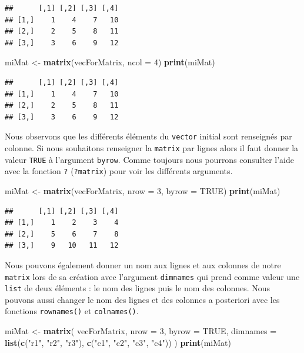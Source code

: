 \documentclass[
]{book}
\newenvironment{Shaded}{\begin{snugshade}}{\end{snugshade}}
\newcommand{\DataTypeTok}[1]{\textcolor[rgb]{0.13,0.29,0.53}{#1}}
\newcommand{\DecValTok}[1]{\textcolor[rgb]{0.00,0.00,0.81}{#1}}
\newcommand{\KeywordTok}[1]{\textcolor[rgb]{0.13,0.29,0.53}{\textbf{#1}}}
\newcommand{\NormalTok}[1]{#1}
\newcommand{\OtherTok}[1]{\textcolor[rgb]{0.56,0.35,0.01}{#1}}
\newcommand{\StringTok}[1]{\textcolor[rgb]{0.31,0.60,0.02}{#1}}
\begin{document}
\begin{verbatim}
##      [,1] [,2] [,3] [,4]
## [1,]    1    4    7   10
## [2,]    2    5    8   11
## [3,]    3    6    9   12
\end{verbatim}

\begin{Shaded}
\begin{Highlighting}[]
\NormalTok{miMat <-}\StringTok{ }\KeywordTok{matrix}\NormalTok{(vecForMatrix, }\DataTypeTok{ncol =} \DecValTok{4}\NormalTok{)}
\KeywordTok{print}\NormalTok{(miMat)}
\end{Highlighting}
\end{Shaded}

\begin{verbatim}
##      [,1] [,2] [,3] [,4]
## [1,]    1    4    7   10
## [2,]    2    5    8   11
## [3,]    3    6    9   12
\end{verbatim}

Nous observons que les différents éléments du \texttt{vector} initial sont renseignés par colonne. Si nous souhaitons renseigner la \texttt{matrix} par lignes alors il faut donner la valeur \texttt{TRUE} à l'argument \texttt{byrow}. Comme toujours nous pourrons consulter l'aide avec la fonction \texttt{?} (\texttt{?matrix}) pour voir les différents arguments.

\begin{Shaded}
\begin{Highlighting}[]
\NormalTok{miMat <-}\StringTok{ }\KeywordTok{matrix}\NormalTok{(vecForMatrix, }\DataTypeTok{nrow =} \DecValTok{3}\NormalTok{, }\DataTypeTok{byrow =} \OtherTok{TRUE}\NormalTok{)}
\KeywordTok{print}\NormalTok{(miMat)}
\end{Highlighting}
\end{Shaded}

\begin{verbatim}
##      [,1] [,2] [,3] [,4]
## [1,]    1    2    3    4
## [2,]    5    6    7    8
## [3,]    9   10   11   12
\end{verbatim}

Nous pouvons également donner un nom aux lignes et aux colonnes de notre \texttt{matrix} lors de sa création avec l'argument \texttt{dimnames} qui prend comme valeur une \texttt{list} de deux éléments : le nom des lignes puis le nom des colonnes. Nous pouvons aussi changer le nom des lignes et des colonnes a posteriori avec les fonctions \texttt{rownames()} et \texttt{colnames()}.

\begin{Shaded}
\begin{Highlighting}[]
\NormalTok{miMat <-}\StringTok{ }\KeywordTok{matrix}\NormalTok{(}
\NormalTok{  vecForMatrix, }
  \DataTypeTok{nrow =} \DecValTok{3}\NormalTok{, }
  \DataTypeTok{byrow =} \OtherTok{TRUE}\NormalTok{, }
  \DataTypeTok{dimnames =} \KeywordTok{list}\NormalTok{(}\KeywordTok{c}\NormalTok{(}\StringTok{"r1"}\NormalTok{, }\StringTok{"r2"}\NormalTok{, }\StringTok{"r3"}\NormalTok{), }\KeywordTok{c}\NormalTok{(}\StringTok{"c1"}\NormalTok{, }\StringTok{"c2"}\NormalTok{, }\StringTok{"c3"}\NormalTok{, }\StringTok{"c4"}\NormalTok{))}
\NormalTok{)}
\KeywordTok{print}\NormalTok{(miMat)}
\end{Highlighting}
\end{Shaded}
\end{document}
